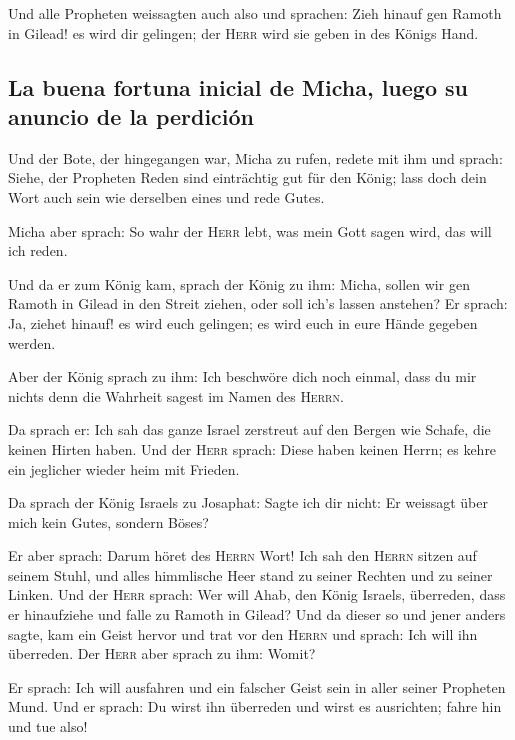  Und alle Propheten weissagten auch also und sprachen:
Zieh hinauf gen Ramoth in Gilead! es wird dir gelingen; der
\textsc{Herr} wird sie geben in des Königs Hand.

\hypertarget{la-buena-fortuna-inicial-de-micha-luego-su-anuncio-de-la-perdiciuxf3n}{%
\subsection{La buena fortuna inicial de Micha, luego su anuncio de la
perdición}\label{la-buena-fortuna-inicial-de-micha-luego-su-anuncio-de-la-perdiciuxf3n}}

 Und der Bote, der hingegangen war, Micha zu rufen,
redete mit ihm und sprach: Siehe, der Propheten Reden sind einträchtig
gut für den König; lass doch dein Wort auch sein wie derselben eines und
rede Gutes.

 Micha aber sprach: So wahr der \textsc{Herr} lebt, was
mein Gott sagen wird, das will ich reden.

 Und da er zum König kam, sprach der König zu ihm: Micha,
sollen wir gen Ramoth in Gilead in den Streit ziehen, oder soll ich's
lassen anstehen? Er sprach: Ja, ziehet hinauf! es wird euch gelingen; es
wird euch in eure Hände gegeben werden.

 Aber der König sprach zu ihm: Ich beschwöre dich noch
einmal, dass du mir nichts denn die Wahrheit sagest im Namen des
\textsc{Herrn}.

 Da sprach er: Ich sah das ganze Israel zerstreut auf den
Bergen wie Schafe, die keinen Hirten haben. Und der \textsc{Herr}
sprach: Diese haben keinen Herrn; es kehre ein jeglicher wieder heim mit
Frieden.

 Da sprach der König Israels zu Josaphat: Sagte ich dir
nicht: Er weissagt über mich kein Gutes, sondern Böses?

 Er aber sprach: Darum höret des \textsc{Herrn} Wort! Ich
sah den \textsc{Herrn} sitzen auf seinem Stuhl, und alles himmlische
Heer stand zu seiner Rechten und zu seiner Linken.  Und
der \textsc{Herr} sprach: Wer will Ahab, den König Israels, überreden,
dass er hinaufziehe und falle zu Ramoth in Gilead? Und da dieser so und
jener anders sagte,  kam ein Geist hervor und trat vor
den \textsc{Herrn} und sprach: Ich will ihn überreden. Der \textsc{Herr}
aber sprach zu ihm: Womit?

 Er sprach: Ich will ausfahren und ein falscher Geist
sein in aller seiner Propheten Mund. Und er sprach: Du wirst ihn
überreden und wirst es ausrichten; fahre hin und tue also!

